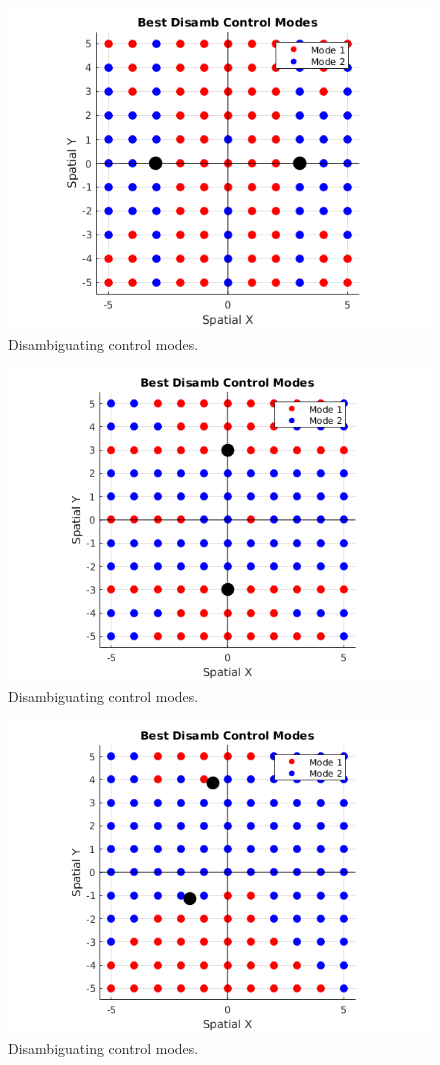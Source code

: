 \documentclass[]{article}
\begin{document}
\begin{figure}[h]
	\centering
	\includegraphics[width = 0.6\hsize, height = 0.25\vsize]{./figures/X_Config.png}
	\vspace{-0.4cm}
	\caption{Disambiguating control modes.}
\end{figure}
\begin{figure}[h!]
	\centering
	\includegraphics[width = 0.6\hsize, height = 0.3\vsize]{./figures/Y_Config.png}
	\vspace{-0.4cm}
	\caption{Disambiguating control modes.}
\end{figure}
\begin{figure}[h!]
	\centering
	\includegraphics[width = 0.6\hsize, height = 0.27\vsize]{./figures/Config1.png}
	\vspace{-0.4cm}
	\caption{Disambiguating control modes.}
\end{figure}
\end{document}
